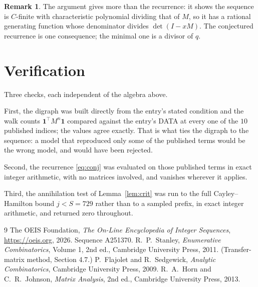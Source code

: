 \documentclass[11pt,a4paper]{article}
\theoremstyle{plain}
\theoremstyle{definition}
\newtheorem{remark}[theorem]{Remark}
\begin{document}
\begin{remark}
The argument gives more than the recurrence: it shows the sequence is $C$-finite with
characteristic polynomial dividing that of $M$, so it has a rational generating function
whose denominator divides $\det(I-xM)$. The conjectured recurrence is one consequence; the
minimal one is a divisor of $q$.
\end{remark}

\section{Verification}

Three checks, each independent of the algebra above.

First, the digraph was built directly from the entry's stated condition and the walk counts
$\mathbf{1}^{\!\top}M^{n}\mathbf{1}$ compared against the entry's DATA at every one of
the $10$ published indices; the values agree exactly. That is what ties the digraph to
the sequence: a model that reproduced only some of the published terms would be the wrong
model, and would have been rejected.

Second, the recurrence \eqref{eq:conj} was evaluated on those published terms in exact
integer arithmetic, with no matrices involved, and vanishes wherever it applies.

Third, the annihilation test of Lemma~\ref{lem:crit} was run to the full Cayley--Hamilton
bound $j<S=729$ rather than to a sampled prefix, in exact integer arithmetic, and returned
zero throughout.

\begin{thebibliography}{9}
 The OEIS Foundation, \emph{The On-Line Encyclopedia of Integer
Sequences}, \url{https://oeis.org}, 2026. Sequence A251370.
 R.~P.~Stanley, \emph{Enumerative Combinatorics}, Volume 1, 2nd ed.,
Cambridge University Press, 2011. (Transfer-matrix method, Section 4.7.)
 P.~Flajolet and R.~Sedgewick, \emph{Analytic Combinatorics}, Cambridge
University Press, 2009.
 R.~A.~Horn and C.~R.~Johnson, \emph{Matrix Analysis}, 2nd ed., Cambridge
University Press, 2013.
\end{thebibliography}
\end{document}
